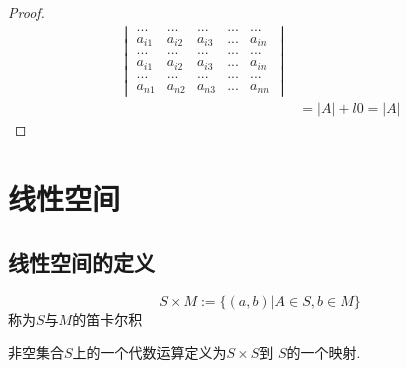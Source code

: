 \documentclass[blue,normal,cn]{elegantnote}
\begin{document}
\begin{proof}
\begin{equation*}
\begin{aligned}
\begin{vmatrix}
                ...&...&...&...&...\\
                a_{i1}&a_{i2} & a_{i3} &...& a_{in}\\
                ...&...&...&...&...\\
                a_{i1}&a_{i2} & a_{i3} &...& a_{in}\\
                ...&...&...&...&...\\
                a_{n1}&a_{n2} & a_{n3} &...& a_{nn}
                \end{vmatrix}
                \\
        &=|A|+l0=|A|
        \end{aligned}
        \end{equation*}
\end{proof}

\section{线性空间}
\subsection{线性空间的定义}

\begin{definition}
    $$S\times M:=\{(a,b)|A∈ S,b ∈ M\}$$
称为$S$与$M$的笛卡尔积
\end{definition}

\begin{definition}
   非空集合$S$上的一个代数运算定义为$S\times S$到 $S$的一个映射.
\end{definition}
\end{document}
